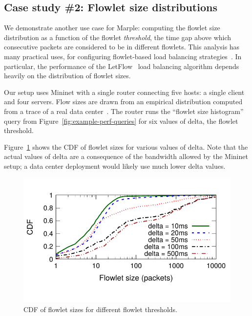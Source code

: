 \subsection{Case study \#2: Flowlet size distributions}
\label{s:eval:mininet-flowlet}
\label{sec:eval:mininet-flowlet}

We demonstrate another use case for Marple: computing the flowlet size
distribution as a function of the flowlet \emph{threshold}, the time gap above
which consecutive packets are considered to be in different flowlets.  This
analysis has many practical uses, \eg for configuring flowlet-based load
balancing strategies~\cite{conga, letflow}.  In particular, the performance of
the LetFlow~\cite{letflow} load balancing algorithm depends heavily on the
distribution of flowlet sizes. 

Our setup uses Mininet with a single router connecting five hosts: a single
client and four servers. Flow sizes are drawn from an empirical distribution
computed from a trace of a real data center~\cite{empirical-flow-data}.  The
router runs the ``flowlet size histogram'' query from
Figure~\ref{fig:example-perf-queries} for six values of {\ct delta}, the
flowlet threshold.

Figure~\ref{fig:flowletcdf} shows the CDF of flowlet sizes for various values
of {\ct delta}. Note that the actual values of {\ct delta} are a consequence of
the bandwidth allowed by the Mininet setup; a data center deployment would
likely use much lower {\ct delta} values.

\begin{figure}[!t]
\centering
\vspace{-0.2in}
\includegraphics[width=0.8\columnwidth]{pq_flowlet-cdf.pdf}
\vspace{-0.3in}
\caption{CDF of flowlet sizes for different flowlet thresholds.}
\vspace{-0.15in}
\label{fig:flowletcdf}
\end{figure}
